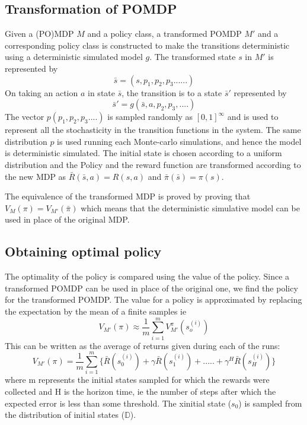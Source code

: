 \documentclass[hidelinks,BTech]{iitmdiss}
\begin{document}
\subsection*{Transformation of POMDP}
Given a (PO)MDP $M$ and a policy class, a transformed POMDP $M'$ and a corresponding policy class is constructed to make the transitions deterministic using a deterministic simulated model $g$. The transformed state $s$ in $M'$ is represented by
\begin{equation}
	\bar{s} = (s, p_1, p_2, p_3......)
\end{equation}
On taking an action $a$ in state $\bar{s}$, the transition is to a state $\bar{s}'$ represented by
\begin{equation}
	\bar{s}' = g(\bar{s}, a, p_2, p_3, ....) 
\end{equation}
The vector $p(p_1, p_2, p_3 ....)$ is sampled randomly as $[0,1]^{\infty}$ and is used to represent all the stochasticity in the transition functions in the system. The same distribution $p$ is used running each Monte-carlo  simulations, and hence the model is deterministic simulated. The initial state is chosen according to a uniform distribution and the Policy and the reward function are transformed according to the new MDP as $\bar{R}(\bar{s}, a) = R(s, a)$ and $\bar{\pi}(\bar{s}) = \pi(s)$.

The equivalence of the transformed MDP is proved by proving that $V_M(\pi)=V_{M'}(\bar{\pi})$ which means that the deterministic simulative model can be used in place of the original MDP.
		

\subsection*{Obtaining optimal policy}
The optimality of the policy is compared using the value of the policy. Since a transformed POMDP can be used in place of the original one, we find the policy for the transformed POMDP. The value for a policy is approximated by replacing the expectation by the mean of a finite samples ie 
\begin{equation}
	V_{M'}({\pi}) \approx  \frac{1}{m} \sum_{i=1}^{m} V_{M'}^\pi(s_o^{(i)})
\end{equation}
This can be written as the average of returns given during each of the runs:
\begin{equation}
	V_{M'}({\pi}) = \frac{1}{m} \sum_{i=1}^{m} \{\bar{R}(s_0^{(i)})+\gamma \bar{R}(s_1^{(i)}) + ..... + \gamma^H \bar{R}(s_H^{(i)}) \}
\end{equation}
where m represents the initial states sampled for which the rewards were collected and H is the horizon time, ie the number of steps after which the expected error is less than some threshold. The xinitial state ($s_0$) is sampled from the distribution of initial states ($\mathbb{D}$). 
\end{document}
